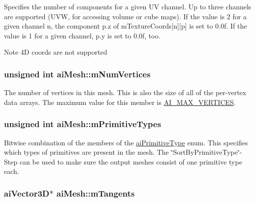 Specifies the number of components for a given U\-V channel. Up to three channels are supported (U\-V\-W, for accessing volume or cube maps). If the value is 2 for a given channel n, the component p.\-z of m\-Texture\-Coords\mbox{[}n\mbox{]}\mbox{[}p\mbox{]} is set to 0.\-0f. If the value is 1 for a given channel, p.\-y is set to 0.\-0f, too. \begin{DoxyNote}{Note}
4\-D coords are not supported 
\end{DoxyNote}
\hypertarget{structai_mesh_ab34b7b5941e6636f1c08f615cbb072ef}{
\subsubsection[{m\-Num\-Vertices}]{\setlength{\rightskip}{0pt plus 5cm}unsigned {\bf int} ai\-Mesh\-::m\-Num\-Vertices}}\label{structai_mesh_ab34b7b5941e6636f1c08f615cbb072ef}
The number of vertices in this mesh. This is also the size of all of the per-\/vertex data arrays. The maximum value for this member is \hyperlink{mesh_8h_aa3997d5751b93f15e4c9d86ced093b56}{A\-I\-\_\-\-M\-A\-X\-\_\-\-V\-E\-R\-T\-I\-C\-E\-S}. \hypertarget{structai_mesh_a99d66ac0a444068c1b252b30265cbf53}{
\subsubsection[{m\-Primitive\-Types}]{\setlength{\rightskip}{0pt plus 5cm}unsigned {\bf int} ai\-Mesh\-::m\-Primitive\-Types}}\label{structai_mesh_a99d66ac0a444068c1b252b30265cbf53}
Bitwise combination of the members of the \hyperlink{mesh_8h_ac352902280db7c3bd8ba64c133b7f03f}{ai\-Primitive\-Type} enum. This specifies which types of primitives are present in the mesh. The \char`\"{}\-Sort\-By\-Primitive\-Type\char`\"{}-\/\-Step can be used to make sure the output meshes consist of one primitive type each. \hypertarget{structai_mesh_af367ff78bd69f3e83d7edc8ad67dc5df}{
\subsubsection[{m\-Tangents}]{ {\bf ai\-Vector3\-D}$\ast$ ai\-Mesh\-::m\-Tangents}}\label{structai_mesh_af367ff78bd69f3e83d7edc8ad67dc5df}
